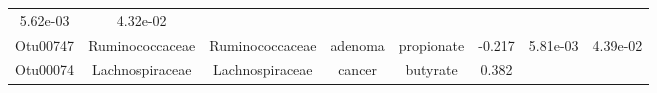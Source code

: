 \documentclass[11pt,]{article}
\begin{document}
\begin{longtable}[]{@{}cccccccc@{}}
\begin{minipage}[t]{0.08\columnwidth}
5.62e-03\strut
\end{minipage} & \begin{minipage}[t]{0.08\columnwidth}\centering\strut
4.32e-02\strut
\end{minipage}\tabularnewline
\begin{minipage}[t]{0.08\columnwidth}\centering\strut
Otu00747\strut
\end{minipage} & \begin{minipage}[t]{0.15\columnwidth}\centering\strut
Ruminococcaceae\strut
\end{minipage} & \begin{minipage}[t]{0.15\columnwidth}\centering\strut
Ruminococcaceae\strut
\end{minipage} & \begin{minipage}[t]{0.08\columnwidth}\centering\strut
adenoma\strut
\end{minipage} & \begin{minipage}[t]{0.09\columnwidth}\centering\strut
propionate\strut
\end{minipage} & \begin{minipage}[t]{0.07\columnwidth}\centering\strut
-0.217\strut
\end{minipage} & \begin{minipage}[t]{0.08\columnwidth}\centering\strut
5.81e-03\strut
\end{minipage} & \begin{minipage}[t]{0.08\columnwidth}\centering\strut
4.39e-02\strut
\end{minipage}\tabularnewline
\begin{minipage}[t]{0.08\columnwidth}\centering\strut
Otu00074\strut
\end{minipage} & \begin{minipage}[t]{0.15\columnwidth}\centering\strut
Lachnospiraceae\strut
\end{minipage} & \begin{minipage}[t]{0.15\columnwidth}\centering\strut
Lachnospiraceae\strut
\end{minipage} & \begin{minipage}[t]{0.08\columnwidth}\centering\strut
cancer\strut
\end{minipage} & \begin{minipage}[t]{0.09\columnwidth}\centering\strut
butyrate\strut
\end{minipage} & \begin{minipage}[t]{0.07\columnwidth}\centering\strut
0.382\strut
\end{minipage} & \begin{minipage}[t]{0.08\columnwidth}\centering\strut

\end{minipage}
\end{longtable}
\end{document}
